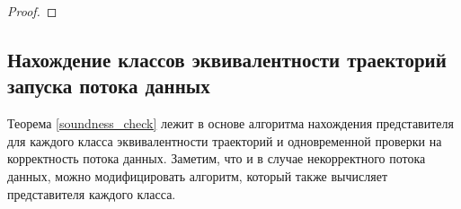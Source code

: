 \documentclass[10pt,a4paper]{article}
\begin{document}
  \begin{proof}
  \end{proof}
  
\subsection{Нахождение классов эквивалентности траекторий запуска потока данных}
  Теорема \ref{soundness_check} лежит в основе алгоритма нахождения представителя для каждого класса эквивалентности траекторий и одновременной проверки на корректность потока данных.
  Заметим, что и в случае некорректного потока данных, можно модифицировать алгоритм, который также вычисляет представителя каждого класса.
  
\end{document}
